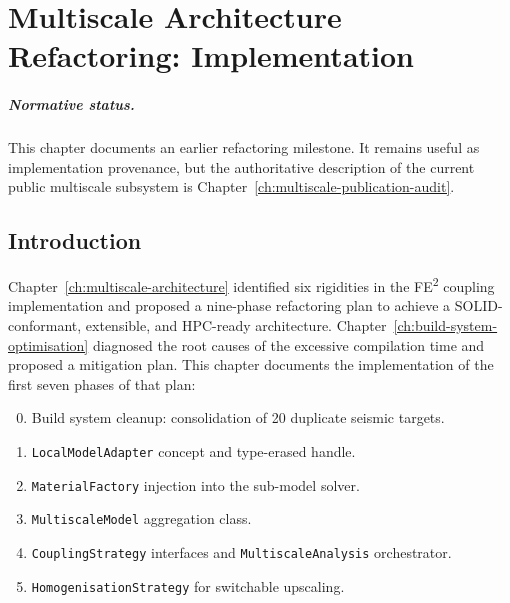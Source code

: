 
\chapter{Multiscale Architecture Refactoring: Implementation}
\label{ch:multiscale-refactoring}

\paragraph{Normative status.}
This chapter documents an earlier refactoring milestone.  It remains useful as
implementation provenance, but the authoritative description of the current
public multiscale subsystem is Chapter~\ref{ch:multiscale-publication-audit}.


\section{Introduction}
\label{sec:refactor-intro}

Chapter~\ref{ch:multiscale-architecture} identified six rigidities in
the FE\textsuperscript{2} coupling implementation and proposed a
nine-phase refactoring plan to achieve a SOLID-conformant,
extensible, and HPC-ready architecture.  Chapter~\ref{ch:build-system-optimisation}
diagnosed the root causes of the excessive compilation time and
proposed a mitigation plan.  This chapter documents the
implementation of the first seven phases of that plan:

\begin{enumerate}[label=\textbf{Phase \arabic*}:]
  \setcounter{enumi}{-1}
  \item Build system cleanup: consolidation of 20 duplicate seismic
    targets.
  \item \texttt{LocalModelAdapter} concept and type-erased handle.
  \item \texttt{MaterialFactory} injection into the sub-model solver.
  \item \texttt{MultiscaleModel} aggregation class.
  \item \texttt{CouplingStrategy} interfaces and \texttt{MultiscaleAnalysis}
    orchestrator.
  \item \texttt{HomogenisationStrategy} for switchable upscaling.
\end{enumerate}

